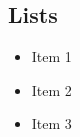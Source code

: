 \documentclass{article}
\providecommand{\tightlist}{%
  \setlength{\itemsep}{0pt}\setlength{\parskip}{0pt}}
\begin{document}
\hypertarget{lists}{%
\subsection{Lists}\label{lists}}

\begin{itemize}
\tightlist
\item
  Item 1
\item
  Item 2
\item
  Item 3
\end{itemize}



\end{document}

